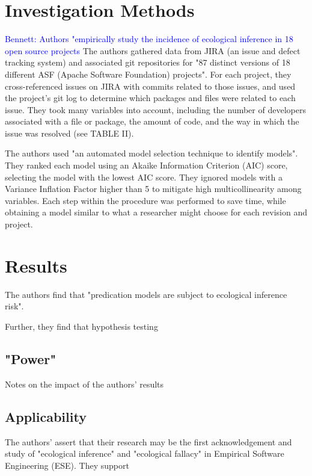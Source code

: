 \documentclass{acm_proc_article-sp}
\newcommand{\commentm}[1]{\textsf{#1}} %
\newcommand{\bennett}[1]{\commentm{\textcolor{blue}{Bennett: #1}}}
\begin{document}
\begin{itemize}
\section{Investigation Methods}
\label{invest}
\bennett{Authors "empirically study the incidence of ecological inference in 18 open source projects}
The authors gathered data from JIRA (an issue and defect tracking system) and associated git repositories for "87 distinct versions of 18 different ASF (Apache Software Foundation) projects".  For each project, they cross-referenced issues on JIRA with commits related to those issues, and used the project's git log to determine which packages and files were related to each issue.  They took many variables into account, including the number of developers associated with a file or package, the amount of code, and the way in which the issue was resolved (see TABLE II).

The authors used "an automated model selection technique to identify models".  They ranked each model using an Akaike Information Criterion (AIC) score, selecting the model with the lowest AIC score.  They ignored models with a Variance Inflation Factor higher than 5 to mitigate high multicollinearity among variables.  Each step within the procedure was performed to save time, while obtaining a model similar to what a researcher might choose for each revision and project.

\section{Results}
\label{results}
The authors find that "predication models are subject to ecological inference risk".  

Further, they find that hypothesis testing 

\subsection{"Power"}
\label{results-power}
Notes on the impact of the authors' results

\subsection{Applicability}
\label{results-apply}
The authors' assert that their research may be the first acknowledgement and study of "ecological inference" and "ecological fallacy" in Empirical Software Engineering (ESE).  They support 


\end{itemize}
\end{document}
